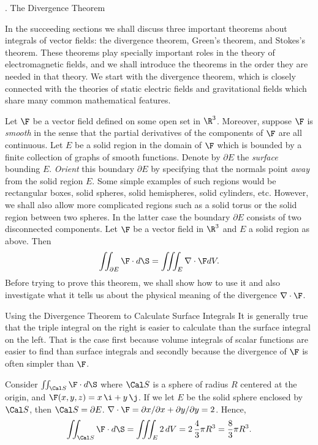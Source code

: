 \bigskip

\bigskip
\goodbreak
{}
\head \sn. The Divergence Theorem \endhead

In the succeeding sections we shall discuss three important theorems
about integrals of vector fields: the divergence theorem, Green's
theorem, and Stokes's theorem.   These theorems play specially
important roles in the theory of electromagnetic fields,
 and we shall introduce
the theorems in the order they are needed in that theory.
We start with the divergence theorem, which is closely connected
with the theories of static electric fields and gravitational fields
which share many common mathematical features.

Let $\F$ be a vector field defined on some open set in
$\R^3$.  Moreover,
suppose $\F$ is {\it smooth\/} in the sense that the partial
derivatives of the components of $\F$ are all continuous.  Let
$E$ be a solid region in the domain of $\F$ which is bounded
by a finite collection of graphs of smooth functions.   Denote
by $\partial E$ the {\it surface\/} bounding $E$.   {\it Orient\/}
this boundary $\partial E$ by
specifying that the normals point {\it away\/}
from the solid region $E$.  Some simple examples of such regions
would be rectangular boxes,  solid spheres, solid hemispheres,
solid cylinders, etc.  However, we shall also allow more complicated
regions such as a solid torus
or the solid region between two spheres.  In the latter
case the boundary $\partial E$ consists of two disconnected
components.
\smallskip
{}
\nextthm
{}
Let $\F$ be a vector field in $\R^3$  and $E$ a solid region
as above.  Then
$$
    \iint_{\partial E} \F\cdot d\S
    = \iiint_E \nabla\cdot\F dV.
$$
\endproclaim
{}%
Before trying to prove this theorem, we shall show how to use it
and also investigate what it tells us about the physical meaning
of the divergence $\nabla\cdot \F$.

\subhead Using the Divergence Theorem 
to Calculate Surface Integrals \endsubhead
 It is generally true that the triple integral on the right is
easier to calculate than the surface integral on the left.  That
is the case first because volume integrals  of  scalar
functions are easier to find than surface integrals and secondly
because the divergence of $\F$ is often simpler than $\F$.

\nextex
{}  Consider $\iint_{\Cal S} \F\cdot d\S$
where $\Cal S$ is a sphere of radius $R$ centered at the
origin, and $\F(x,y,z) = x\,\i + y\,\j$.   If we let $E$ be
the solid sphere enclosed by $\Cal S$, then $\Cal S = \partial E$.
$\nabla\cdot \F = \partial x/\partial x + \partial y/\partial y = 2$.
Hence,
$$
\iint_{\Cal S} \F\cdot d\S = \iiint_E 2\, dV = 2 \, \frac 43 \pi R^3
 = \frac 83 \pi R^3.
$$

